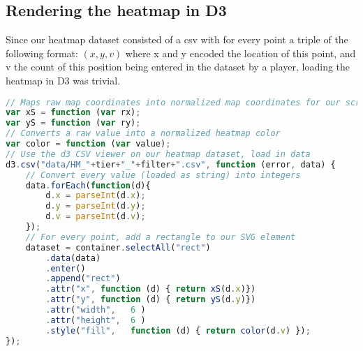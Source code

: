 \subsection{Rendering the heatmap in D3}
Since our heatmap dataset consisted of a csv with for every point a triple of the following format: $(x, y, v)$ where x and y encoded the location of this point, and v the count of this position being entered in the dataset by a player, loading the heatmap in D3 was trivial.

\begin{lstlisting}[language=JavaScript]
// Maps raw map coordinates into normalized map coordinates for our screen
var xS = function (var rx);
var yS = function (var ry);
// Converts a raw value into a normalized heatmap color
var color = function (var value);
// Use the d3 CSV viewer on our heatmap dataset, load in data
d3.csv("data/HM_"+tier+"_"+filter+".csv", function (error, data) {
	// Convert every value (loaded as string) into integers
	data.forEach(function(d){
	    d.x = parseInt(d.x);
	    d.y = parseInt(d.y);
	    d.v = parseInt(d.v);
	});
	// For every point, add a rectangle to our SVG element
	dataset = container.selectAll("rect")
	    .data(data)
	    .enter()
	    .append("rect")
	    .attr("x", function (d) { return xS(d.x)})
	    .attr("y", function (d) { return yS(d.y)})
	    .attr("width",   6 ) 
	    .attr("height",  6 )
	    .style("fill",   function (d) { return color(d.v) });
});
\end{lstlisting}